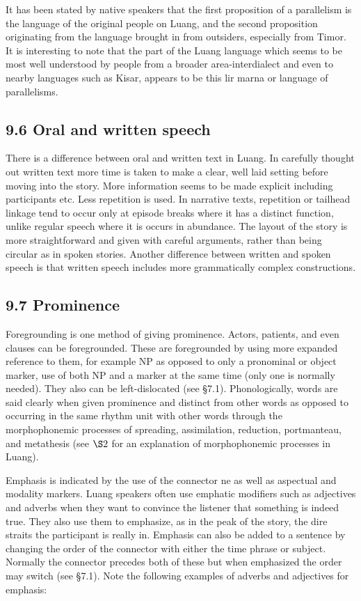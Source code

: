 \documentclass[10pt]{article}
\begin{document}
It has been stated by native speakers that the first proposition of a parallelism is the language of the original people on Luang, and the second proposition originating from the language brought in from outsiders, especially from Timor. It is interesting to note that the part of the Luang language which seems to be most well understood by people from a broader area-interdialect and even to nearby languages such as Kisar, appears to be this lir marna or language of parallelisms.

\subsection*{9.6 Oral and written speech}
There is a difference between oral and written text in Luang. In carefully thought out written text more time is taken to make a clear, well laid setting before moving into the story. More information seems to be made explicit including participants etc. Less repetition is used. In narrative texts, repetition or tailhead linkage tend to occur only at episode breaks where it has a distinct function, unlike regular speech where it is occurs in abundance. The layout of the story is more straightforward and given with careful arguments, rather than being circular as in spoken stories. Another difference between written and spoken speech is that written speech includes more grammatically complex constructions.

\subsection*{9.7 Prominence}
Foregrounding is one method of giving prominence. Actors, patients, and even clauses can be foregrounded. These are foregrounded by using more expanded reference to them, for example NP as opposed to only a pronominal or object marker, use of both NP and a marker at the same time (only one is normally needed). They also can be left-dislocated (see §7.1). Phonologically, words are said clearly when given prominence and distinct from other words as opposed to occurring in the same rhythm unit with other words through the morphophonemic processes of spreading, assimilation, reduction, portmanteau, and metathesis (see \(\S 2\) for an explanation of morphophonemic processes in Luang).

Emphasis is indicated by the use of the connector ne as well as aspectual and modality markers. Luang speakers often use emphatic modifiers such as adjectives and adverbs when they want to convince the listener that something is indeed true. They also use them to emphasize, as in the peak of the story, the dire straits the participant is really in. Emphasis can also be added to a sentence by changing the order of the connector with either the time phrase or subject. Normally the connector precedes both of these but when emphasized the order may switch (see §7.1). Note the following examples of adverbs and adjectives for emphasis:
\end{document}

